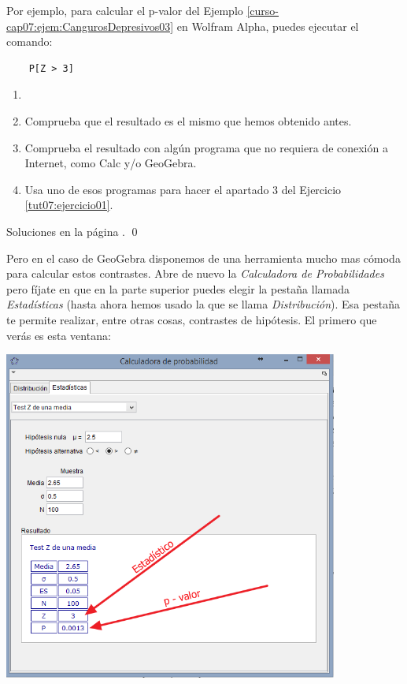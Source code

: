 \documentclass[10pt,a4paper]{article}\usepackage[]{graphicx}\usepackage[]{color}
\newcounter {cont01}
\begin{document}
Por ejemplo, para calcular el p-valor del Ejemplo \ref{curso-cap07:ejem:CangurosDepresivos03} en Wolfram Alpha, puedes ejecutar el comando:
\begin{center}
\begin{verbatim}
    P[Z > 3]
\end{verbatim}
\end{center}

\begin{ejercicio}
\label{tut07:ejercicio02}
\begin{enumerate}
  \item[]
  \item Comprueba que el resultado es el mismo que hemos obtenido antes.

  \item Comprueba el resultado con algún programa que no requiera de conexión a Internet, como Calc y/o GeoGebra.
  \item Usa uno de esos programas para hacer el apartado 3 del Ejercicio \ref{tut07:ejercicio01}.
\end{enumerate}
Soluciones en la página \pageref{tut07:ejercicio02:sol}.
\qed
\end{ejercicio}

Pero en el caso de GeoGebra disponemos de una herramienta mucho mas cómoda para calcular estos contrastes. Abre de nuevo la {\em Calculadora de Probabilidades} pero fíjate en que en la parte superior puedes elegir la pestaña llamada {\em Estadísticas} (hasta ahora hemos usado la que se llama {\em Distribución}). Esa pestaña te permite realizar, entre otras cosas, contrastes de hipótesis. El primero que verás es esta ventana:

\begin{center}
    \includegraphics[width=11cm]{../fig/Tut07-11.png}
\end{center}
\end{document}
